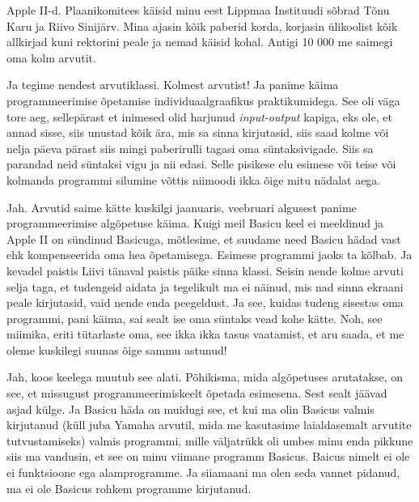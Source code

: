 
Apple II-d. Plaanikomitees käisid minu eest Lippmaa Instituudi sõbrad Tõnu Karu ja Riivo Sinijärv. Mina ajasin kõik paberid korda, korjasin ülikoolist kõik allkirjad kuni rektorini peale ja nemad käisid kohal. Antigi 10 000 me saimegi oma kolm arvutit.

Ja tegime nendest arvutiklassi. Kolmest arvutist! Ja panime käima programmeerimise õpetamise individuaalgraafikus praktikumidega. See oli väga tore aeg, sellepärast et inimesed olid harjunud \emph{input-output} kapiga, eks ole, et annad sisse, siis unustad kõik ära, mis sa sinna kirjutasid, siis saad kolme või nelja päeva pärast siis mingi paberirulli tagasi oma süntaksivigade. Siis sa parandad neid süntaksi vigu ja nii edasi. Selle pisikese elu esimese või teise või kolmanda programmi silumine võttis niimoodi ikka õige mitu nädalat aega. 


Jah. Arvutid saime kätte kuskilgi jaanuaris, veebruari algusest panime  programmeerimise algõpetuse käima. Kuigi meil Basicu keel ei meeldinud ja Apple II on sündinud Basicuga, mõtlesime, et suudame need Basicu hädad vast ehk kompenseerida oma hea õpetamisega. Esimese programmi jaoks ta kõlbab. Ja kevadel paistis Liivi tänaval paistis päike sinna klassi. Seisin nende kolme arvuti selja taga, et tudengeid aidata ja tegelikult ma ei näinud, mis nad sinna ekraani peale kirjutasid, vaid nende enda peegeldust. Ja see, kuidas tudeng sisestas oma programmi, pani käima, sai sealt ise oma süntaks vead kohe kätte. Noh, see miimika, eriti tütarlaste oma, see ikka ikka tasus vaatamist, et aru saada, et me oleme kuskilegi suunas õige sammu astunud! 


Jah, koos keelega muutub see alati. Põhikisma, mida algõpetuses arutatakse, on see, et missugust programmeerimiskeelt õpetada esimesena. Sest sealt jäävad asjad külge. Ja Basicu häda on muidugi see, et kui ma olin Basicus valmis kirjutanud (küll juba Yamaha arvutil, mida me kasutasime  laialdasemalt arvutite tutvustamiseks) valmis programmi, mille väljatrükk oli umbes minu enda pikkune siis ma vandusin, et see on minu viimane programm Basicus. Baicus nimelt ei ole ei funktsioone ega alamprogramme. Ja siiamaani ma olen seda vannet pidanud, ma ei ole Basicus rohkem programme kirjutanud. 


